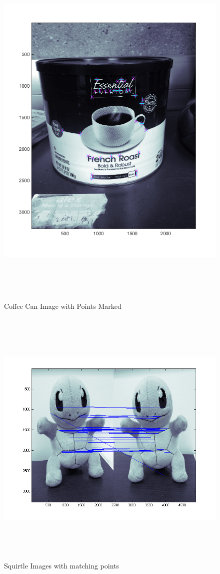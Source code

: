 \documentclass[11pt,psfig]{article}
\begin{document}
\begin{figure}[H]
\centering
\includegraphics[height=7in]{coffeeCan_prob2Points.png}
\caption{Coffee Can Image with Points Marked}
\label{p2c}
\end{figure}

\begin{figure}[H]
\centering
\includegraphics[height=5in]{squirtle_prob2Matches2.png}
\caption{Squirtle Images with matching points}
\label{p2d}
\end{figure}
\end{document}
